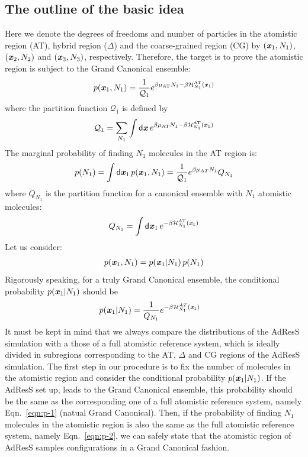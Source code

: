 \documentclass[aip,jcp,a4paper,reprint,onecolumn]{revtex4-1}
\newcommand{\vect}[1]{\textbf{\textit{#1}}}
\newcommand{\dd}[1]{\textsf{#1}}
\newcommand{\AT}{{\textrm{{AT}}}}
\newcommand{\HY}{{\Delta}}
\begin{document}
\subsection{The outline of the basic idea}
Here we denote the degrees of freedoms and number of particles in the
atomistic region (AT), hybrid region ($\HY$) and the coarse-grained
region (CG) by $(\vect x_1, N_1)$, $(\vect x_2, N_2)$ and $(\vect x_3,
N_3)$, respectively. Therefore, the target is to prove the atomistic
region is subject to the Grand Canonical ensemble: 
\begin{align}
  p(\vect x_1, N_1) = \frac{1}{\mathcal Q_1}
  e^{\beta\mu_{\AT} N_1 - \beta \mathcal H_{N_1}^{\AT}(\vect x_1)} 
\end{align}
where the partition function $\mathcal Q_1$ is defined by
\begin{align}
  \mathcal Q_1 =
  \sum_{N_1}\int
  \dd d\vect x\,
  e^{\beta\mu_{\AT} N_1 - \beta \mathcal H_{N_1}^{\AT}(\vect x_1)}
\end{align}
The marginal probability of finding $N_1$ molecules in the
AT region is:
\begin{align}\label{eqn:p-2}
  p(N_1) = \int\dd d\vect x_1\, p(\vect x_1, N_1)
  =
  \frac{1}{\mathcal Q_1}e^{\beta\mu_{AT} N_1}Q_{N_1}
\end{align}
where $Q_{N_1}$ is the partition function for a canonical ensemble
with $N_1$ atomistic molecules:
\begin{align}
  Q_{N_1}  =
  \int\dd d\vect x_1\,
  e^{ - \beta \mathcal H_{N_1}^{\AT}(\vect x_1)}
\end{align}
Let us consider:
\begin{align}
  p(\vect x_1, N_1) = p(\vect x_1 | N_1)\,p(N_1)
\end{align}
Rigorously speaking, for a truly Grand Canonical ensemble,
the conditional probability $p(\vect x_1 | N_1)$ 
should be
\begin{align}\label{eqn:p-1}
  p(\vect x_1 | N_1) &= \frac{1}{Q_{N_1}} e^{-\beta \mathcal H_{N_1}^{AT}(\vect x_1)} \end{align}
It must be kept in mind that we always compare the distributions of the AdResS simulation
with a those of a full atomistic reference system, which is ideally divided
in subregions corresponding to the AT, $\HY$ and CG regions of the AdResS
simulation. The first step in our procedure is to fix the number of molecules in the atomistic
region and consider the conditional probability $p(\vect x_1 |
N_1)$. If the AdResS set up, leads to the Grand Canonical ensemble, this
probability should be the same as the corresponding one of a full
atomistic reference system, namely Eqn.~\eqref{eqn:p-1} (natual Grand Canonical).  Then, if the
probability of finding $N_1$ molecules in the atomistic region is also
the same as the full atomistic reference system, namely
Eqn.~\eqref{eqn:p-2}, we can safely state that the atomistic region of AdResS
samples configurations in a Grand Canonical fashion.
\end{document}
